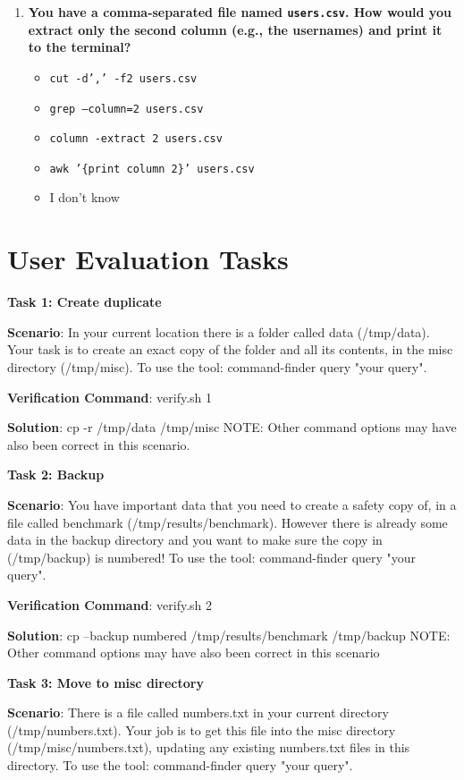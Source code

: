 \begin{appendix}
\begin{enumerate}
    \item \textbf{You have a comma-separated file named \texttt{users.csv}. How would you extract only the second column (e.g., the usernames) and print it to the terminal?}
    \begin{itemize}
        \item[\textbf{A)}] \texttt{cut -d',' -f2 users.csv}
        \item[\textbf{B)}] \texttt{grep --column=2 users.csv}
        \item[\textbf{C)}] \texttt{column -extract 2 users.csv}
        \item[\textbf{D)}] \texttt{awk '\{print column 2\}' users.csv}
        \item[\textbf{E)}] I don't know
    \end{itemize}
\end{enumerate}

\section{User Evaluation Tasks}\label{app:Evaluation_tasks}

\textbf{Task 1: Create duplicate}

\textbf{Scenario}: In your current location there is a folder called data (/tmp/data). Your task is to create an exact copy of the folder and all its contents, in the misc directory (/tmp/misc). To use the tool: command-finder query "your query".

\textbf{Verification Command}: verify.sh 1

\textbf{Solution}: cp -r /tmp/data /tmp/misc NOTE: Other command options may have also been correct in this scenario.


\textbf{Task 2: Backup}  

\textbf{Scenario}: You have important data that you need to create a safety copy of, in a file called benchmark (/tmp/results/benchmark). However there is already some data in the backup directory and you want to make sure the copy in (/tmp/backup) is numbered! To use the tool: command-finder query "your query".  

\textbf{Verification Command}: verify.sh 2  

\textbf{Solution}: cp --backup numbered /tmp/results/benchmark /tmp/backup NOTE: Other command options may have also been correct in this scenario

\textbf{Task 3: Move to misc directory}  

\textbf{Scenario}: There is a file called numbers.txt in your current directory (/tmp/numbers.txt). Your job is to get this file into the misc directory (/tmp/misc/numbers.txt), updating any existing numbers.txt files in this directory. To use the tool: command-finder query "your query".  


\end{appendix}
